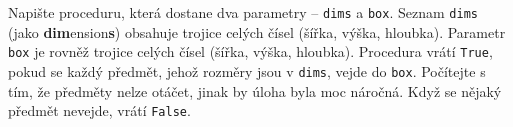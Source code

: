 \question[50]
Napište proceduru, která dostane dva parametry -- \texttt{dims} a \texttt{box}.
Seznam \texttt{dims} (jako \textbf{dim}ension\textbf{s}) obsahuje trojice celých
čísel (šířka, výška, hloubka). Parametr \texttt{box} je rovněž trojice celých
čísel (šířka, výška, hloubka). Procedura vrátí \texttt{True}, pokud se každý
předmět, jehož rozměry jsou v \texttt{dims}, vejde do \texttt{box}. Počítejte s
tím, že předměty nelze otáčet, jinak by úloha byla moc náročná. Když se nějaký
předmět nevejde, vrátí \texttt{False}.